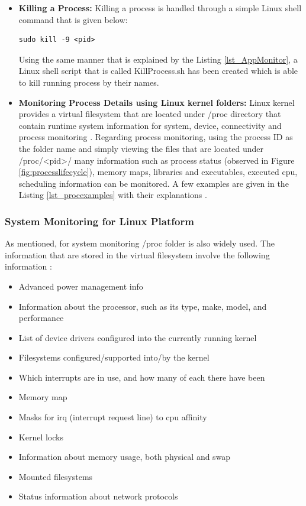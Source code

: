 \begin{itemize}
	\item \textbf{Killing a Process:} Killing a process is handled through a simple Linux shell command that is given below:
	\begin{lstlisting}[style=bash]
		sudo kill -9 <pid>
	\end{lstlisting}
	Using the same manner that is explained by the Listing \ref{lst_AppMonitor}, a Linux shell script that is called KillProcess.sh has been created which is able to kill running process by their names.
	\item \textbf{Monitoring Process Details using Linux kernel folders:} Linux kernel provides a virtual filesystem that are located under /proc directory that contain runtime system information for system, device, connectivity and process monitoring \cite{linuxproc}. Regarding process monitoring, using the process ID as the folder name and simply viewing the files that are located under /proc/<pid>/ many information such as process status (observed in Figure \ref{fig:processlifecycle}), memory maps, libraries and executables, executed cpu, scheduling information can be monitored. A few examples are given in the Listing \ref{lst_procexamples} with their explanations \cite{linuxproc}.
	
	
\end{itemize} 
\subsubsection{System Monitoring for Linux Platform}
As mentioned, for system monitoring /proc folder is also widely used. The information that are stored in the virtual filesystem involve the following information \cite{linuxproc}:
\begin{itemize}
	\item Advanced power management info
	\item Information about the processor, such as its type, make, model, and performance
 	\item  List of device drivers configured into the currently running kernel
 	\item Filesystems configured/supported into/by the kernel
 	\item Which interrupts are in use, and how many of each there have been
 	\item Memory map
 	\item Masks for irq (interrupt request line) to cpu affinity
 	\item Kernel locks
 	\item Information about memory usage, both physical and swap
 	\item Mounted filesystems
 	\item Status information about network protocols
\end{itemize}

